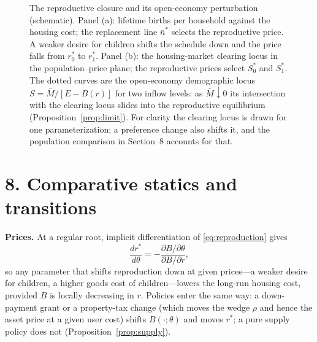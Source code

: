 \documentclass[11pt]{article}
\theoremstyle{definition}
\begin{document}
\begin{figure}[ht!]
\caption{The reproductive closure and its open-economy perturbation
(schematic). Panel (a): lifetime births per household against the housing
cost; the replacement line $\bar n^{*}$ selects the reproductive price. A
weaker desire for children shifts the schedule down and the price falls from
$r_0^{*}$ to $r_1^{*}$. Panel (b): the housing-market clearing locus in the
population--price plane; the reproductive prices select $S_0^{*}$ and
$S_1^{*}$. The dotted curves are the open-economy demographic locus
$S=\bar M/[E-B(r)]$ for two inflow levels: as $\bar M\downarrow0$ its
intersection with the clearing locus slides into the reproductive equilibrium
(Proposition~\ref{prop:limit}). For clarity the clearing locus is drawn for
one parameterization; a preference change also shifts it, and the
population comparison in Section~8 accounts for that.}
\label{fig:loci}
\end{figure}

\section*{8. Comparative statics and transitions}

\textbf{Prices.} At a regular root, implicit differentiation of
\eqref{eq:reproduction} gives
\[
\frac{dr^{*}}{d\theta}
=-\frac{\partial B/\partial\theta}{\partial B/\partial r},
\]
so any parameter that shifts reproduction down at given prices---a weaker
desire for children, a higher goods cost of children---lowers the long-run
housing cost, provided $B$ is locally decreasing in $r$. Policies enter the
same way: a down-payment grant or a property-tax change (which moves the wedge
$\rho$ and hence the asset price at a given user cost) shifts $B(\cdot;\theta)$
and moves $r^{*}$; a pure supply policy does not (Proposition~\ref{prop:supply}).
\end{document}
